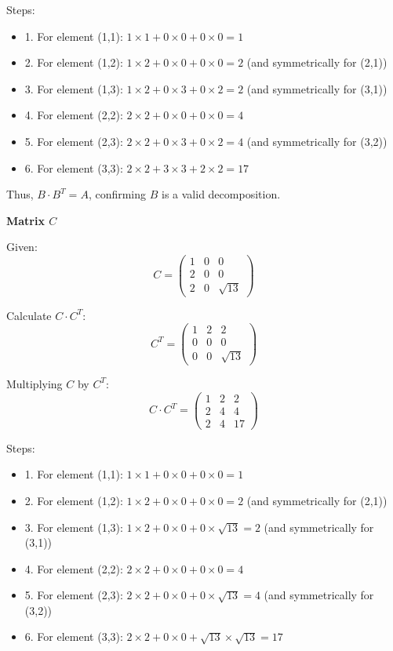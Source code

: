 \documentclass{article}
\begin{document}
Steps:
\begin{itemize}
    \item 1. For element (1,1): \(1 \times 1 + 0 \times 0 + 0 \times 0 = 1\)
    \item 2. For element (1,2): \(1 \times 2 + 0 \times 0 + 0 \times 0 = 2\) (and symmetrically for (2,1))
    \item 3. For element (1,3): \(1 \times 2 + 0 \times 3 + 0 \times 2 = 2\) (and symmetrically for (3,1))
    \item 4. For element (2,2): \(2 \times 2 + 0 \times 0 + 0 \times 0 = 4\)
    \item 5. For element (2,3): \(2 \times 2 + 0 \times 3 + 0 \times 2 = 4\) (and symmetrically for (3,2))
    \item 6. For element (3,3): \(2 \times 2 + 3 \times 3 + 2 \times 2 = 17\)
\end{itemize}

Thus, \(B \cdot B^T = A\), confirming \(B\) is a valid decomposition.

\textbf{Matrix \(C\)}

Given:
\[ C = \begin{pmatrix} 1 & 0 & 0 \\ 2 & 0 & 0 \\ 2 & 0 & \sqrt{13} \end{pmatrix} \]

Calculate \(C \cdot C^T\):
\[ C^T = \begin{pmatrix} 1 & 2 & 2 \\ 0 & 0 & 0 \\ 0 & 0 & \sqrt{13} \end{pmatrix} \]

Multiplying \(C\) by \(C^T\):
\[ C \cdot C^T = \begin{pmatrix} 1 & 2 & 2 \\ 2 & 4 & 4 \\ 2 & 4 & 17 \end{pmatrix} \]

Steps:
\begin{itemize}
    \item 1. For element (1,1): \(1 \times 1 + 0 \times 0 + 0 \times 0 = 1\)
    \item 2. For element (1,2): \(1 \times 2 + 0 \times 0 + 0 \times 0 = 2\) (and symmetrically for (2,1))
    \item 3. For element (1,3): \(1 \times 2 + 0 \times 0 + 0 \times \sqrt{13} = 2\) (and symmetrically for (3,1))
    \item 4. For element (2,2): \(2 \times 2 + 0 \times 0 + 0 \times 0 = 4\)
    \item 5. For element (2,3): \(2 \times 2 + 0 \times 0 + 0 \times \sqrt{13} = 4\) (and symmetrically for (3,2))
    \item 6. For element (3,3): \(2 \times 2 + 0 \times 0 + \sqrt{13} \times \sqrt{13} = 17\)
\end{itemize}
\end{document}
